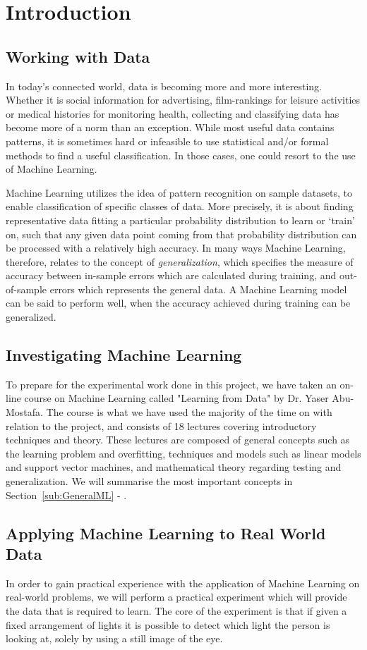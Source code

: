 \section{Introduction}
\label{sec:Introduction}
\subsection{Working with Data}
In today's connected world, data is becoming more and more interesting. 
Whether it is social information for advertising, film-rankings for leisure activities or medical histories for monitoring health,
collecting and classifying data has become more of a norm than an exception.
While most useful data contains patterns, it is sometimes hard or infeasible to use statistical and/or formal methods 
to find a useful classification. In those cases, one could resort to the use of Machine Learning.

Machine Learning utilizes the idea of pattern recognition on sample datasets,
to enable classification of specific classes of data.
More precisely, it is about finding representative data fitting a particular probability distribution to learn or `train' on, 
such that any given data point coming from that probability distribution can be processed with a relatively high accuracy.
In many ways Machine Learning, therefore, relates to the concept of \emph{generalization}, which specifies 
the measure of accuracy between in-sample errors which are calculated during training, and out-of-sample errors which represents the general data.
A Machine Learning model can be said to perform well, when the accuracy achieved during training can be generalized.

\subsection{Investigating Machine Learning}
To prepare for the experimental work done in this project, we have taken an on-line course
on Machine Learning called "Learning from Data" by Dr. Yaser Abu-Mostafa\cite{learningfromdata2012course}.
The course is what we have used the majority of the time on with relation to the project, and consists
of 18 lectures covering introductory techniques and theory.
These lectures are composed of general concepts such as the learning problem and overfitting, 
techniques and models such as linear models and support vector machines, 
and mathematical theory regarding testing and generalization.
We will summarise the most important concepts in Section~\ref{sub:GeneralML} - .

\subsection{Applying Machine Learning to Real World Data}
In order to gain practical experience with the application of Machine Learning on real-world problems, we will perform a practical experiment
which will provide the data that is required to learn.
The core of the experiment is that if given a fixed arrangement of lights it is possible to detect which light the person is looking at, solely by using a still image of the eye.
